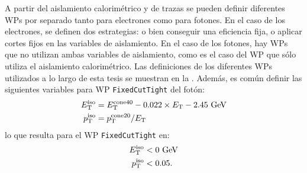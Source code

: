 \begin{table}[ht!]
    \caption{Resumen de los \ac{WP} de aislamiento para electrones y fotones usados a lo largo de esta tesis.}
    \label{fig:objects:egamma:iso:iso_table}
\end{table}

A partir del aislamiento calorimétrico y de trazas se pueden definir diferentes \acp{WP} por separado tanto para electrones como para fotones. En el caso de los electrones, se definen dos estrategias: o bien conseguir una eficiencia fija, o aplicar cortes fijos en las variables de aislamiento. En el caso de los fotones, hay \acp{WP} que no utilizan ambas variables de aislamiento, como es el caso del \ac{WP} que sólo utiliza el aislamiento calorimétrico. Las definiciones de los diferentes \acp{WP} utilizados a lo largo de esta tesis se muestran en la \Tab{\ref{fig:objects:egamma:iso:iso_table}}. Además, es común definir las siguientes variables para \ac{WP} \texttt{FixedCutTight} del fotón:
\begin{align}
    \label{eq:objects:egamma:iso:definitions}
    E_{\text{T}}^{\text{iso}} &= E_{\text{T}}^{\text{cone40}} - 0.022 \times E_{\text{T}} - 2.45~\text{GeV}\\
    p_{\text{T}}^{\text{iso}} &= p_{\text{T}}^{\text{cone20}} / E_{\text{T}}
\end{align}
lo que resulta para el \ac{WP} \texttt{FixedCutTight} en:
\begin{align}
    E_{\text{T}}^{\text{iso}} &< 0 ~\text{GeV}\\
    p_{\text{T}}^{\text{iso}} &< 0.05.
\end{align}















